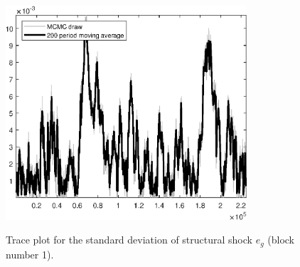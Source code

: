 \begin{figure}[H]
\centering
  \includegraphics[width=0.8\textwidth]{BRS_sectoral/graphs/TracePlot_SE_e_g_blck_1}\\
    \caption{Trace plot for the standard deviation of structural shock ${e_g}$ (block number 1).}
\end{figure}
